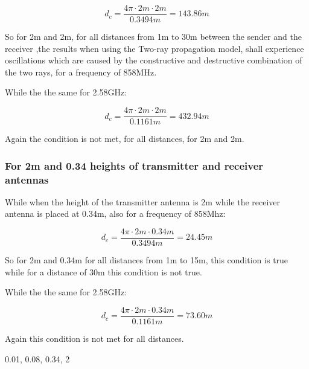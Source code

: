 \begin{equation}
d_{c} = \frac{4\pi \cdot 2m \cdot 2m}{0.3494m} = 143.86m
\label{critical_fac_dc_calc_2_2_858MHz}
\end{equation}

So for 2m and 2m, for all distances from 1m to 30m between the sender and the receiver ,the results when using the Two-ray propagation model, shall experience oscillations which are caused by the constructive and destructive combination of the two rays, for a frequency of 858MHz.

While the the same for 2.58GHz:

\begin{equation}
d_{c} = \frac{4\pi \cdot 2m \cdot 2m}{0.1161m} = 432.94m
\label{critical_fac_dc_calc_2_2_2.58GHz}
\end{equation}

Again the condition is not met, for all distances, for 2m and 2m.


\subsubsection{For 2m and 0.34 heights of transmitter and receiver antennas}
While when the height of the transmitter antenna is 2m while the receiver antenna is placed at 0.34m, also for a frequency of 858Mhz:

\begin{equation}
d_{c} = \frac{4\pi \cdot 2m \cdot 0.34m}{0.3494m} = 24.45m
\label{critical_fac_dc_calc_2_0.34}
\end{equation}

So for 2m and 0.34m for all distances from 1m to 15m, this condition is true while for a distance of 30m this condition is not true.

While the the same for 2.58GHz:

\begin{equation}
d_{c} = \frac{4\pi \cdot 2m \cdot 0.34m}{0.1161m} = 73.60m
\label{critical_fac_dc_calc_2_0.34.58GHz}
\end{equation}

Again this condition is not met for all distances.

0.01, 0.08, 0.34, 2
 




